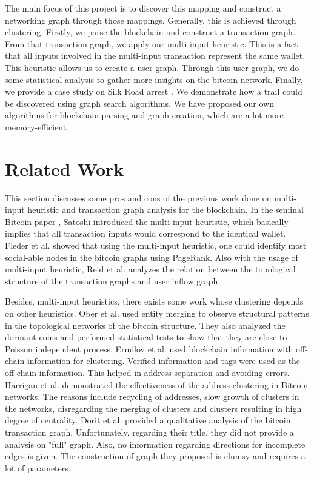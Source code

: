\documentclass[runningheads,a4paper]{llncs}[2017/09/04]
\begin{document}
The main focus of this project is to discover this mapping and construct a networking graph through those mappings. Generally, this is achieved through clustering. Firstly, we parse the blockchain and construct a transaction graph. From that transaction graph, we apply our multi-input heuristic. This is a fact that all inputs involved in the multi-input transaction represent the same wallet. This heuristic allows us to create a user graph. Through this user graph, we do some statistical analysis to gather more insights on the bitcoin network. Finally, we provide a case study on Silk Road arrest \cite{anderson_farivar_2013}. We demonstrate how a trail could be discovered using graph search algorithms. We have proposed our own algorithms for blockchain parsing and graph creation, which are a lot more memory-efficient.

\section{Related Work}

This section discusses some pros and cons of the previous work done on multi-input heuristic and transaction graph analysis for the blockchain.
In the seminal Bitcoin paper \cite{nakamoto2008bitcoin}, Satoshi introduced the multi-input heuristic, which basically implies that all transaction inputs would correspond to the identical wallet.
Fleder et al. \cite{fleder2015bitcoin} showed that using the multi-input heuristic, one could identify most social-able nodes in the bitcoin graphs using PageRank.
Also with the usage of multi-input heuristic, Reid et al. \cite{reid2013analysis} analyzes the relation between the topological structure of the transaction graphs and user inflow graph.

Besides, multi-input heuristics, there exists some work whose clustering depends on other heuristics.
Ober et al. \cite{ober2013structure} used entity merging to observe structural patterns in the topological networks of the bitcoin structure.
They also analyzed the dormant coins and performed statistical tests to show that they are close to Poisson independent process.
Ermilov et al. \cite{ermilov2017automatic} used blockchain information with off-chain information for clustering. 
Verified information and tags were used as the off-chain information.
This helped in address separation and avoiding errors.
Harrigan et al. \cite{harrigan2016unreasonable} demonstrated the effectiveness of the address clustering in Bitcoin networks.
The reasons include recycling of addresses, slow growth of clusters in the networks, disregarding the merging of clusters and clusters resulting in high degree of centrality.
Dorit et al. \cite{ron2013quantitative} provided a qualitative analysis of the bitcoin transaction graph.
Unfortunately, regarding their title, they did not provide a analysis on "full" graph. 
Also, no information regarding directions for incomplete edges is given.
The construction of graph they proposed is clumsy and requires a lot of parameters.
\end{document}
